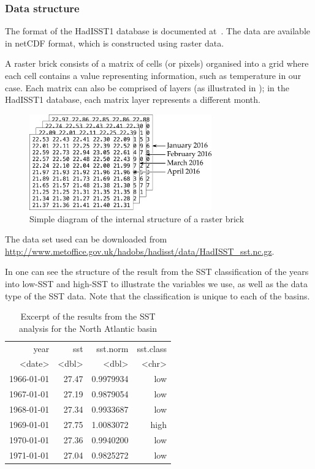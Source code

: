 \subsubsection{Data structure}
The format of the HadISST1 database is documented at~\cite{o:hadisst1-format}. The data are available in netCDF format, which is constructed using raster data.

A raster brick consists of a matrix of cells (or pixels) organised into a grid where each cell contains a value representing information, such as temperature in our case. Each matrix can also be comprised of layers (as illustrated in ); in the HadISST1 database, each matrix layer represents a different month.
\begin{figure}[H]
	\centering
	\includegraphics[width=0.7\textwidth]{images/raster}
	\caption{Simple diagram of the internal structure of a raster brick}
	\label{fig:raster}
\end{figure}

The data set used can be downloaded from \url{http://www.metoffice.gov.uk/hadobs/hadisst/data/HadISST_sst.nc.gz}.

\bigskip
In  one can see the structure of the result from the SST classification of the years into low-SST and high-SST to illustrate the variables we use, as well as the data type of the SST data. Note that the classification is unique to each of the basins.
\begin{table}[H]
	\centering
	\ttfamily
	\begin{tabular}{r r r r}
		\toprule
		\toprule
		year & sst & sst.norm & sst.class \\
		<date> &   <dbl>   &  <dbl> &    <chr> \\
		\midrule
		1966-01-01 & 27.47 & 0.9979934 &  low \\
		1967-01-01 & 27.19 & 0.9879054 &  low \\
		1968-01-01 & 27.34 & 0.9933687 &  low \\
		1969-01-01 & 27.75 & 1.0083072 & high \\
		1970-01-01 & 27.36 & 0.9940200 &  low \\
		1971-01-01 & 27.04 & 0.9825272 &  low \\
		\bottomrule
	\end{tabular}
	\caption{Excerpt of the results from the SST analysis for the North Atlantic basin}
	\label{hd:sst-head}
\end{table}
